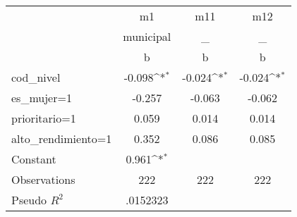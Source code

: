 {
\def\sym#1{\ifmmode^{#1}\else\(^{#1}\)\fi}
\begin{tabular}{l*{3}{c}}
\hline\hline
                &       m1         &      m11         &      m12         \\
                &municipal         &        \_         &        \_         \\
                &        b         &        b         &        b         \\
\hline
cod\_nivel       &   -0.098\sym{*}  &   -0.024\sym{*}  &   -0.024\sym{*}  \\
es\_mujer=1      &   -0.257         &   -0.063         &   -0.062         \\
prioritario=1   &    0.059         &    0.014         &    0.014         \\
alto\_rendimiento=1&    0.352         &    0.086         &    0.085         \\
Constant        &    0.961\sym{*}  &                  &                  \\
\hline
Observations    &      222         &      222         &      222         \\
Pseudo \(R^{2}\)& .0152323         &                  &                  \\
\hline\hline
\end{tabular}
}
